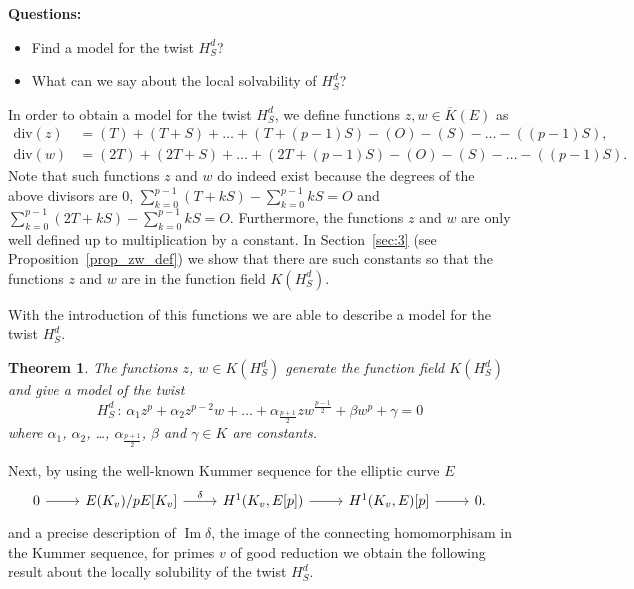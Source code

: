 \documentclass[a4paper, 12pt]{amsart}
\newtheorem{theorem}{Theorem}[section]
\theoremstyle{definition}
\theoremstyle{remark}
\DeclareMathOperator{\im}{Im}
\renewcommand{\div}{\mathrm{div}}
\numberwithin{equation}{section}
\begin{document}
\noindent \textbf{Questions:}
    \begin{itemize}
        \item Find a model for the twist $H_S^d$?

        \item  What can we say about the local solvability of $H_S^d$?
    \end{itemize}

In order to obtain a model for the twist $H_S^d$, we define functions $z,w \in \overline{K}(E)$ as
\begin{align*}
    \div{(z)} &= (T)+(T+S)+\dotso+(T+(p-1)S)-(O)-(S)-\dotso -((p-1)S),\\
    \div{(w)} &= (2T)+(2T+S)+\dotso+(2T+(p-1)S)-(O)-(S)-\dotso -((p-1)S).
\end{align*}
Note that such functions $z$ and $w$ do indeed exist because the degrees of the above divisors are $0$, $\displaystyle{\sum_{k=0}^{p-1}(T+kS) - \sum_{k=0}^{p-1}kS = O}$ and $\displaystyle{\sum_{k=0}^{p-1}(2T+kS) - \sum_{k=0}^{p-1}kS = O}$. Furthermore, the functions $z$ and $w$ are only well defined up to multiplication by a constant. In Section~\ref{sec:3} (see Proposition~\ref{prop_zw_def}) we show that there are such constants so that the functions $z$ and $w$ are in the function field $K(H_S^d)$.

With the introduction of this functions we are able to describe a model for the twist $H_S^d$.

\begin{theorem}\label{p-twist_model}
    The functions $z$, $w \in K(H_S^d)$ generate the function field $K(H_S^d)$ and give a model of the twist 
    \[
        H_S^d\,:\, \alpha_{1}z^p+\alpha_2z^{p-2}w+\dotso+\alpha_{\frac{p+1}{2}}zw^{\frac{p-1}{2}}+\beta w^p+\gamma=0
    \]
    where $\alpha_1$, $\alpha_2$, \ldots, $\alpha_{\frac{p+1}{2}}$, $\beta$ and $\gamma \in K$ are constants.
\end{theorem}

Next, by using the well-known Kummer sequence for the elliptic curve $E$
\begin{equation}\label{eq:kummer_seq}
    \begin{tikzcd}
        0 \arrow[r] & E(K_v)/pE[K_v] \arrow[r, "\delta"] & H^1(K_v,E[p]) \arrow[r] & H^1(K_v,E)[p] \arrow[r] & 0.
    \end{tikzcd}    
\end{equation}
and a precise description of $\im{\delta}$, the image of the connecting homomorphisam in the Kummer sequence, for primes $v$ of good reduction we obtain the following result about the locally solubility of the twist $H_S^d$.
\end{document}
